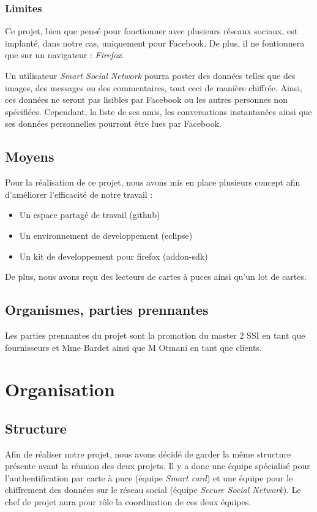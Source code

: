 \documentclass[a4paper,11pt,french]{article}
\begin{document}
\subsubsection{Limites}
	Ce projet, bien que pensé pour fonctionner avec plusieurs réseaux
sociaux, est implanté, dans notre cas, uniquement pour Facebook. De plus,
il ne fontionnera que sur un navigateur : \emph{Firefox}.


	Un utilisateur \emph{Smart Social Network} pourra poster des données
telles que des images, des messages ou des commentaires, tout ceci de manière
chiffrée. Ainsi, ces données ne seront pas lisibles par Facebook ou les
autres personnes non spécifiées. Cependant, la liste de ses amis, les
conversations instantanées ainsi que ses données personnelles pourront être
lues par Facebook.

\subsection{Moyens}
	Pour la réalisation de ce projet, nous avons mis en place plusieurs
concept afin d'améliorer l'efficacité de notre travail :
\begin{itemize}
	\item Un espace partagé de travail (github)
	\item Un environnement de developpement (eclipse)
	\item Un kit de developpement pour firefox (addon-sdk)
\end{itemize}

	De plus, nous avons reçu des lecteurs de cartes à puces ainsi qu'un
lot de cartes.


\subsection{Organismes, parties prennantes}
	Les parties prennantes du projet sont la promotion du master 2 SSI
en tant que fournisseurs et Mme Bardet ainsi que M Otmani en tant que clients.


\newpage

\section{Organisation}
\subsection{Structure}
	Afin de réaliser notre projet, nous avons décidé de garder la même
structure présente avant la réunion des deux projets. Il y a donc une équipe
spécialisé pour l'authentification par carte à puce (équipe \emph{Smart 
card}) et une équipe pour le chiffrement des données sur le réseau social
(équipe \emph{Secure Social Network}). Le chef de projet aura pour rôle
la coordination de ces deux équipes.
\end{document}
